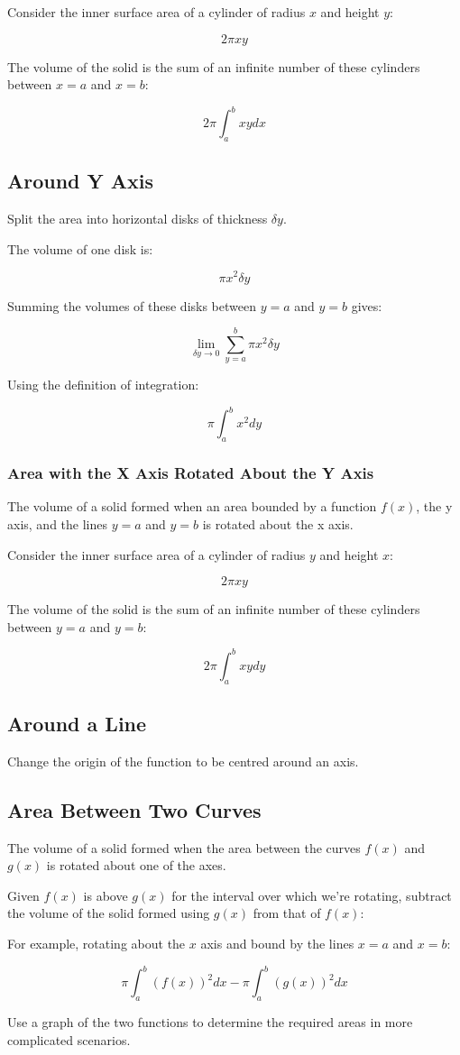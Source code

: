 \documentclass[a4paper,11pt]{article}
\begin{document}
Consider the inner surface area of a cylinder of radius $x$ and height $y$:

$$
2 \pi x y
$$

The volume of the solid is the sum of an infinite number of these cylinders
between $x = a$ and $x = b$:

$$
2 \pi \int^b_a x y dx
$$


\subsection{Around Y Axis}

Split the area into horizontal disks of thickness $\delta y$.

The volume of one disk is:

$$
\pi x^2 \delta y
$$

Summing the volumes of these disks between $y = a$ and $y = b$ gives:

$$
\lim_{\delta y \to 0} \sum_{y = a}^{b} \pi x^2 \delta y
$$

Using the definition of integration:

$$
\pi \int^b_a x^2 dy
$$


\subsubsection{Area with the X Axis Rotated About the Y Axis}

The volume of a solid formed when an area bounded by a function $f(x)$, the y
axis, and the lines $y = a$ and $y = b$ is rotated about the x axis.

Consider the inner surface area of a cylinder of radius $y$ and height $x$:

$$
2 \pi x y
$$

The volume of the solid is the sum of an infinite number of these cylinders
between $y = a$ and $y = b$:

$$
2 \pi \int^b_a x y dy
$$


\subsection{Around a Line}

Change the origin of the function to be centred around an axis.


\subsection{Area Between Two Curves}

The volume of a solid formed when the area between the curves $f(x)$ and $g(x)$
is rotated about one of the axes.

Given $f(x)$ is above $g(x)$ for the interval over which we're rotating,
subtract the volume of the solid formed using $g(x)$ from that of $f(x)$:

For example, rotating about the $x$ axis and bound by the lines $x = a$ and
$x = b$:

$$
\pi \int^b_a (f(x))^2 dx - \pi \int^b_a (g(x))^2 dx
$$

Use a graph of the two functions to determine the required areas in more
complicated scenarios.
\end{document}
